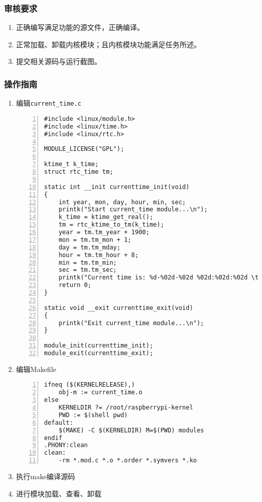 \documentclass{article}
\begin{document}
\subsubsection{审核要求}
\begin{enumerate}
	\item 正确编写满足功能的源文件，正确编译。
	\item 正常加载、卸载内核模块；且内核模块功能满足任务所述。
	\item 提交相关源码与运行截图。
\end{enumerate}

\subsubsection{操作指南}
\begin{enumerate}

	\item 编辑\verb|current_time.c|
	      \begin{lstlisting}[numbers=left]
#include <linux/module.h>
#include <linux/time.h>
#include <linux/rtc.h>

MODULE_LICENSE("GPL");

ktime_t k_time;
struct rtc_time tm;

static int __init currenttime_init(void)
{
	int year, mon, day, hour, min, sec;
	printk("Start current_time module...\n");
	k_time = ktime_get_real();
	tm = rtc_ktime_to_tm(k_time); 
	year = tm.tm_year + 1900;
	mon = tm.tm_mon + 1;
	day = tm.tm_mday;
	hour = tm.tm_hour + 8;
	min = tm.tm_min;
	sec = tm.tm_sec;
	printk("Current time is: %d-%02d-%02d %02d:%02d:%02d \t printed from SYL\n", year, mon, day, hour, min, sec);
	return 0;
}

static void __exit currenttime_exit(void)
{
	printk("Exit current_time module...\n");
}

module_init(currenttime_init);
module_exit(currenttime_exit);

\end{lstlisting}
	\item 编辑Makefile
	      \begin{lstlisting}[numbers=left]
ifneq ($(KERNELRELEASE),)
	obj-m := current_time.o
else
	KERNELDIR ?= /root/raspberrypi-kernel
	PWD := $(shell pwd)
default:
	$(MAKE) -C $(KERNELDIR) M=$(PWD) modules
endif
.PHONY:clean
clean:
	-rm *.mod.c *.o *.order *.symvers *.ko

\end{lstlisting}
	\item 执行make编译源码
	\item 进行模块加载、查看、卸载
\end{enumerate}
\end{document}
